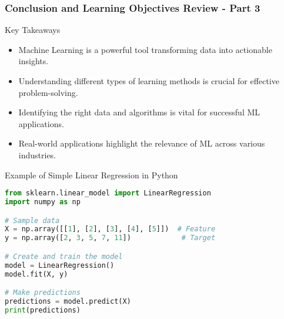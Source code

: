\documentclass[aspectratio=169]{beamer}
\begin{document}
\begin{frame}[fragile]
    \frametitle{Conclusion and Learning Objectives Review - Part 3}
    \begin{block}{Key Takeaways}
        \begin{itemize}
            \item Machine Learning is a powerful tool transforming data into actionable insights.
            \item Understanding different types of learning methods is crucial for effective problem-solving.
            \item Identifying the right data and algorithms is vital for successful ML applications.
            \item Real-world applications highlight the relevance of ML across various industries.
        \end{itemize}
    \end{block}
  
    \begin{block}{Example of Simple Linear Regression in Python}
        \begin{lstlisting}[language=Python]
from sklearn.linear_model import LinearRegression
import numpy as np

# Sample data
X = np.array([[1], [2], [3], [4], [5]])  # Feature
y = np.array([2, 3, 5, 7, 11])            # Target

# Create and train the model
model = LinearRegression()
model.fit(X, y)

# Make predictions
predictions = model.predict(X)
print(predictions)
        \end{lstlisting}
    \end{block}
\end{frame}
\end{document}

